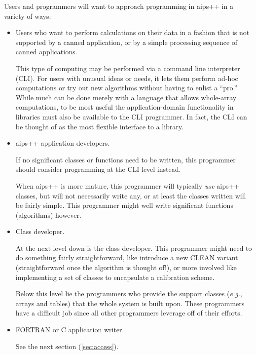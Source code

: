 Users and programmers will want to approach programming in {\sc aips++} in a
variety of ways:
\begin{itemize}
\item Users who want to perform calculations on their data in a fashion
      that is not supported by a canned application, or by a simple
      processing sequence of canned applications.

      This type of computing may be performed via a command line interpreter
      (CLI). For users with unusual ideas or needs, it lets them perform
      ad-hoc computations or try out new algorithms without having to
      enlist a ``pro.'' While much can be done merely with a language
      that allows whole-array computations, to be most useful the
      application-domain functionality in libraries must also be
      available to the CLI programmer. In fact, the CLI can be thought
      of as the most flexible interface to a library.

\item {\sc aips++} application developers.

      If no significant classes or functions need to be written, this
      programmer should consider programming at the CLI level instead.

      When {\sc aips++} is more mature, this programmer will typically
      {\em use} {\sc aips++} classes, but will not necessarily write any, 
      or at least
      the classes written will be fairly simple. This programmer
      might well write significant functions (algorithms) however.

\item Class developer.

      At the next level down is the class developer. This programmer
      might need to do something fairly straightforward, like
      introduce a new CLEAN variant (straightforward once the
      algorithm is thought of!), or more involved like implementing a
      set of classes to encapsulate a calibration scheme.

      Below this level lie the programmers who provide the support
      classes ({\em e.g.}, arrays and  tables) that the whole system is built
      upon. These programmers have a difficult job since all other
      programmers leverage off of their efforts.

\item FORTRAN or C application writer.

      See the next section (\ref{sec:access}).


\end{itemize}
